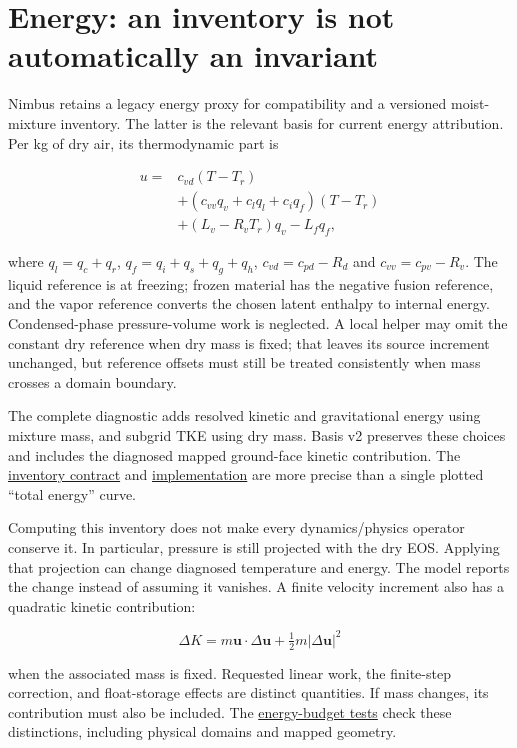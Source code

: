 \documentclass[
  11pt,
]{report}
\begin{document}
\section{Energy: an inventory is not automatically an
invariant}\label{energy-an-inventory-is-not-automatically-an-invariant}

Nimbus retains a legacy energy proxy for compatibility and a versioned
moist-mixture inventory. The latter is the relevant basis for current
energy attribution. Per kg of dry air, its thermodynamic part is

\[\begin{aligned}
u={}&c_{vd}(T-T_r) \\
&+(c_{vv}q_v+c_lq_l+c_iq_f)(T-T_r) \\
&+(L_v-R_vT_r)q_v-L_fq_f,
\end{aligned}\]

where \(q_l=q_c+q_r\), \(q_f=q_i+q_s+q_g+q_h\), \(c_{vd}=c_{pd}-R_d\)
and \(c_{vv}=c_{pv}-R_v\). The liquid reference is at freezing; frozen
material has the negative fusion reference, and the vapor reference
converts the chosen latent enthalpy to internal energy. Condensed-phase
pressure-volume work is neglected. A local helper may omit the constant
dry reference when dry mass is fixed; that leaves its source increment
unchanged, but reference offsets must still be treated consistently when
mass crosses a domain boundary.

The complete diagnostic adds resolved kinetic and gravitational energy
using mixture mass, and subgrid TKE using dry mass. Basis v2 preserves
these choices and includes the diagnosed mapped ground-face kinetic
contribution. The
\href{../include/diagnostics/energy_budget.hpp}{inventory contract} and
\href{../src/diagnostics/budgets/energy_budget.cpp}{implementation} are
more precise than a single plotted ``total energy'' curve.

Computing this inventory does not make every dynamics/physics operator
conserve it. In particular, pressure is still projected with the dry
EOS. Applying that projection can change diagnosed temperature and
energy. The model reports the change instead of assuming it vanishes. A
finite velocity increment also has a quadratic kinetic contribution:

\[\Delta K=m\boldsymbol u\cdot\Delta\boldsymbol u
+\tfrac12m|\Delta\boldsymbol u|^2\]

when the associated mass is fixed. Requested linear work, the
finite-step correction, and float-storage effects are distinct
quantities. If mass changes, its contribution must also be included. The
\href{../tests/diagnostics/test_energy_budget.cpp}{energy-budget tests}
check these distinctions, including physical domains and mapped
geometry.
\end{document}
